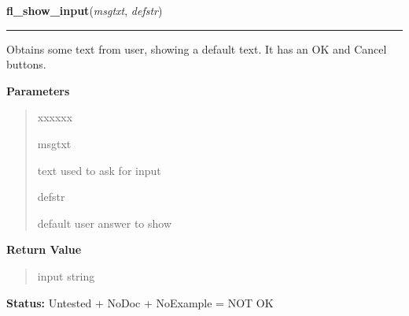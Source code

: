     \label{xformslib:library:fl_show_input}

    \vspace{0.5ex}

\hspace{.8\funcindent}\begin{boxedminipage}{\funcwidth}

    \raggedright \textbf{fl\_show\_input}(\textit{msgtxt}, \textit{defstr})

    \vspace{-1.5ex}

    \rule{\textwidth}{0.5\fboxrule}
\setlength{\parskip}{2ex}
    Obtains some text from user, showing a default text. It has an OK and 
    Cancel buttons.

\setlength{\parskip}{1ex}
      \textbf{Parameters}
      \vspace{-1ex}

      \begin{quote}
        \begin{Ventry}{xxxxxx}

          \item[msgtxt]

          text used to ask for input

          \item[defstr]

          default user answer to show

        \end{Ventry}

      \end{quote}

      \textbf{Return Value}
    \vspace{-1ex}

      \begin{quote}
      input string

      \end{quote}

\textbf{Status:} Untested + NoDoc + NoExample = NOT OK



    \end{boxedminipage}

    \label{xformslib:library:fl_hide_input}

